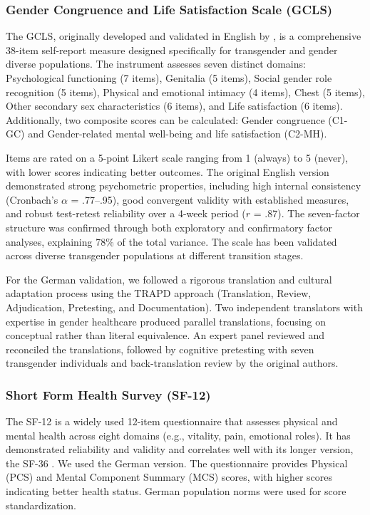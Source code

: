 \documentclass[12pt,a4paper]{article}
\begin{document}
\subsubsection{Gender Congruence and Life Satisfaction Scale (GCLS)}

The GCLS, originally developed and validated in English by \textcite{Jones2016}, is a comprehensive 38-item self-report measure designed specifically for transgender and gender diverse populations. The instrument assesses seven distinct domains: Psychological functioning (7 items), Genitalia (5 items), Social gender role recognition (5 items), Physical and emotional intimacy (4 items), Chest (5 items), Other secondary sex characteristics (6 items), and Life satisfaction (6 items). Additionally, two composite scores can be calculated: Gender congruence (C1-GC) and Gender-related mental well-being and life satisfaction (C2-MH).

Items are rated on a 5-point Likert scale ranging from 1 (always) to 5 (never), with lower scores indicating better outcomes. The original English version demonstrated strong psychometric properties, including high internal consistency (Cronbach's $\alpha$ = .77--.95), good convergent validity with established measures, and robust test-retest reliability over a 4-week period ($r$ = .87). The seven-factor structure was confirmed through both exploratory and confirmatory factor analyses, explaining 78\% of the total variance. The scale has been validated across diverse transgender populations at different transition stages.

For the German validation, we followed a rigorous translation and cultural adaptation process using the TRAPD approach (Translation, Review, Adjudication, Pretesting, and Documentation). Two independent translators with expertise in gender healthcare produced parallel translations, focusing on conceptual rather than literal equivalence. An expert panel reviewed and reconciled the translations, followed by cognitive pretesting with seven transgender individuals and back-translation review by the original authors.

\subsubsection{Short Form Health Survey (SF-12)}

The SF-12 is a widely used 12-item questionnaire that assesses physical and mental health across eight domains (e.g., vitality, pain, emotional roles). It has demonstrated reliability and validity and correlates well with its longer version, the SF-36 \parencite{Ware1996, Gandek1998}. We used the German version. The questionnaire provides Physical (PCS) and Mental Component Summary (MCS) scores, with higher scores indicating better health status. German population norms were used for score standardization.
\end{document}
